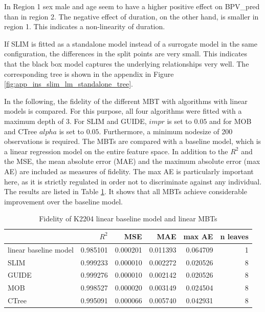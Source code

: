 In Region 1 sex male and age seem to have a higher positive effect on  BPV\_pred than in region 2. The negative effect of duration, on the other hand, is smaller in region 1. This indicates a non-linearity of duration.

If SLIM is fitted as a standalone model instead of a surrogate model in the same configuration, the differences in the split points are very small. This indicates that the black box model captures the underlying relationships very well. The corresponding tree is shown in the appendix in Figure \ref{fig:app_ins_slim_lm_standalone_tree}.

In the following, the fidelity of the different MBT with algorithms with linear models is compared. For this purpose, all four algorithms were fitted with a maximum depth of 3. For SLIM and GUIDE, $impr$ is set to $0.05$ and for MOB and CTree $alpha$ is set to $0.05$. Furthermore, a minimum nodesize of 200 observations is required.
The MBTs are compared with a baseline model, which is a linear regression model on the entire feature space. In addition to the $R^2$ and the MSE, the mean absolute error (MAE) and the maximum absolute error (max AE) are included as measures of fidelity. The max AE is particularly important here, as it is strictly regulated in order not to discriminate against any individual. 
The results are listed in Table \ref{tab:ins_k2204_lm_surrogates_perf}. It shows that all MBTs achieve considerable improvement over the baseline model.

\begin{table}[!htb]

\centering \scriptsize
\begin{tabular}[t]{l|r|r|r|r|r}
\hline
  & $R^2$ & MSE & MAE & max AE & n leaves\\
\hline
linear baseline model & 0.985101 & 0.000201 & 0.011393 & 0.064709 & 1\\
\hline
SLIM & 0.999233 & 0.000010 & 0.002272 & 0.020526 & 8\\
GUIDE & 0.999276 & 0.000010 & 0.002142 & 0.020526 & 8\\
MOB & 0.998527 & 0.000020 & 0.003149 & 0.024504 & 8\\
CTree & 0.995091 & 0.000066 & 0.005740 & 0.042931 & 8\\
\hline
\end{tabular}
\caption{Fidelity of K2204 linear baseline model and linear MBTs}
\label{tab:ins_k2204_lm_surrogates_perf}
\end{table}

